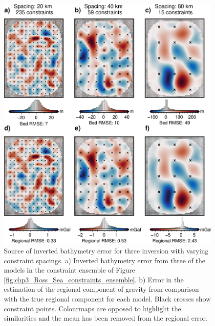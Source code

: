 \begin{figure}[!ht]
    \centering
    \includegraphics[width=.7\textwidth]{figures/chp3/chp3_Ross_Sea_constraints_ensemble_bed_regional_errors.png}
    \caption[Inversion and regional error for Ross Sea constraint ensemble]{Source of inverted bathymetry error for three inversion with varying constraint spacings. a) Inverted bathymetry error from three of the models in the constraint ensemble of Figure \ref{fig:chp3_Ross_Sea_constraints_ensemble}. b) Error in the estimation of the regional component of gravity from comparison with the true regional component for each model. Black crosses show constraint points. Colourmaps are opposed to highlight the similarities and the mean has been removed from the regional error.}
    \label{fig:appB_Ross_Sea_constraint_ensemble_bed_error}
\end{figure}




